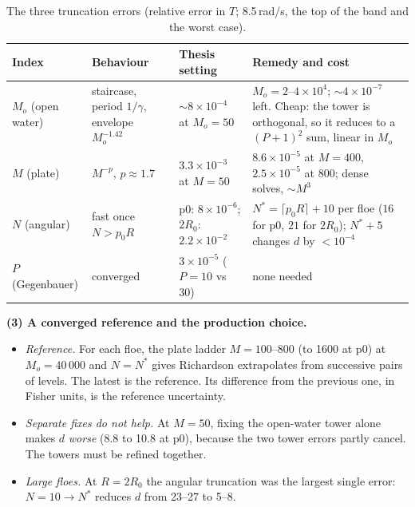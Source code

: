 \documentclass[10pt,a4paper]{article}
\begin{document}
\begin{table}[h]\centering\small
\caption{The three truncation errors (relative error in $T$; 8.5\,rad/s, the top of the band and the worst case).}\label{tab:parts}
\begin{tabularx}{\linewidth}{@{}l L L L@{}}
\toprule
Index & Behaviour & Thesis setting & Remedy and cost \\
\midrule
$M_o$ (open water) & staircase, period $1/\gamma$, envelope $M_o^{-1.42}$ & $\sim8\times10^{-4}$ at $M_o=50$ & $M_o=2$--$4\times10^4$; $\sim4\times10^{-7}$ left. Cheap: the tower is orthogonal, so it reduces to a $(P{+}1)^2$ sum, linear in $M_o$ \\
$M$ (plate) & $M^{-p}$, $p\approx1.7$ & $3.3\times10^{-3}$ at $M=50$ & $8.6\times10^{-5}$ at $M=400$, $2.5\times10^{-5}$ at 800; dense solves, $\sim M^3$ \\
$N$ (angular) & fast once $N>p_0R$ & p0: $8\times10^{-6}$; $2R_0$: $2.2\times10^{-2}$ & $N^*=\lceil p_0R\rceil+10$ per floe ($16$ for p0, $21$ for $2R_0$); $N^*{+}5$ changes $d$ by $<10^{-4}$ \\
$P$ (Gegenbauer) & converged & $3\times10^{-5}$ ($P=10$ vs 30) & none needed \\
\bottomrule
\end{tabularx}
\end{table}

\textbf{(3) A converged reference and the production choice.}
\begin{itemize}
\item \emph{Reference.} For each floe, the plate ladder $M=100$--$800$ (to 1600 at p0) at $M_o=40\,000$ and $N=N^*$ gives Richardson extrapolates from successive pairs of levels. The latest is the reference. Its difference from the previous one, in Fisher units, is the reference uncertainty.
\item \emph{Separate fixes do not help.} At $M=50$, fixing the open-water tower alone makes $d$ \emph{worse} (8.8 to 10.8 at p0), because the two tower errors partly cancel. The towers must be refined together.
\item \emph{Large floes.} At $R=2R_0$ the angular truncation was the largest single error: $N=10\to N^*$ reduces $d$ from 23--27 to 5--8.
\end{itemize}
\end{document}
